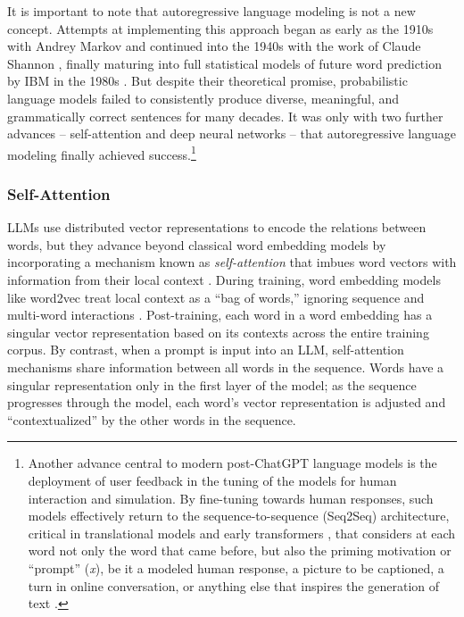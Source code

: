 \documentclass{article} %
\begin{document}
It is important to note that autoregressive language modeling is not a
new concept. Attempts at implementing this approach began as early as
the 1910s with Andrey Markov
\parencite{Gagniuc2017-xm, Hayes2013-yb} and continued into the 1940s with the work of Claude Shannon
\parencite{Shannon1951-ct}, finally
maturing into full statistical models of future word prediction by IBM
in the 1980s \parencite{Rosenfeld2000-rq}. But despite their theoretical promise, probabilistic language
models failed to consistently produce diverse, meaningful, and
grammatically correct sentences for many decades. It was only with two
further advances -- self-attention and deep neural networks -- that
autoregressive language modeling finally achieved success.\footnote{Another
  advance central to modern post-ChatGPT language models is the
  deployment of user feedback in the tuning of the models for human
  interaction and simulation. By fine-tuning towards human responses,
  such models effectively return to the sequence-to-sequence (Seq2Seq)
  architecture, critical in translational models
  \parencite{Xue2020-qb} and
  early transformers \parencite{Vaswani2017-wi}, that considers at each word not only the word that came
  before, but also the priming motivation or ``prompt'' (\emph{x}), be
  it a modeled human response, a picture to be captioned, a turn in
  online conversation, or anything else that inspires the generation of
  text \parencite{Ouyang2022-xw}.}

\subsubsection*{Self-Attention}

LLMs use distributed vector representations to encode the relations
between words, but they advance beyond classical word embedding models
by incorporating a mechanism known as \emph{self-attention} that imbues
word vectors with information from their local context
\parencite{Vaswani2017-wi}.
During training, word embedding models like word2vec treat local context
as a ``bag of words,'' ignoring sequence and multi-word interactions
\parencite{Mikolov2013-va, Pennington2014-dz}. Post-training, each word in a word embedding
has a singular vector representation based on its contexts across the
entire training corpus. By contrast, when a prompt is input into an LLM,
self-attention mechanisms share information between all words in the
sequence. Words have a singular representation only in the first layer
of the model; as the sequence progresses through the model, each word's
vector representation is adjusted and ``contextualized'' by the other
words in the sequence.
\end{document}
